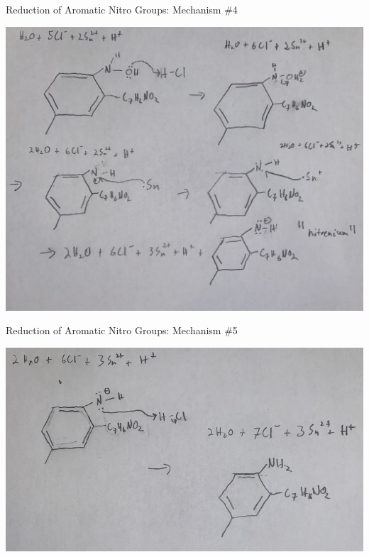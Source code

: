 \documentclass[notes]{beamer}
\begin{document}
\begin{frame}{Reduction of Aromatic Nitro Groups: Mechanism \#4}
    \begin{center}
        \includegraphics[scale=.35]{aromatic_nitro_reduction_four.JPG}
    \end{center}
    
\end{frame}

\begin{frame}{Reduction of Aromatic Nitro Groups: Mechanism \#5}
    \begin{center}
        \includegraphics[scale=.4]{aromatic_nitro_reduction_five.JPG}
    \end{center}
    
\end{frame}
\end{document}
